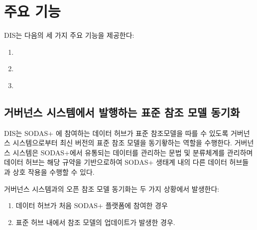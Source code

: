 \documentclass[a4paper,10pt,english]{sphinxmanual}
\begin{document}


\section{주요 기능}
\label{\detokenize{intro:id1}}
\sphinxAtStartPar
DIS는 다음의 세 가지 주요 기능을 제공한다:
\begin{enumerate}
%
\item {} 
\sphinxAtStartPar
{\hyperref[\detokenize{intro:id2}]{}}

\item {} 
\sphinxAtStartPar
{\hyperref[\detokenize{intro:sodas}]{}}

\item {} 
\sphinxAtStartPar
{\hyperref[\detokenize{intro:id3}]{}}

\end{enumerate}


\subsection{거버넌스 시스템에서 발행하는 표준 참조 모델 동기화}
\label{\detokenize{intro:id2}}
\sphinxAtStartPar
DIS는 SODAS+ 에 참여하는 데이터 허브가 표준 참조모델을 따를 수 있도록 거버넌스 시스템으로부터 최신 버전의 표준 참조 모델을 동기홯하는 역할을 수행한다.
거버넌스 시스템은 SODAS+에서 유통되는 데이터를 관리하는 문법 및 분류체계를 관리하며 데이터 허브는 해당 규약을 기반으로하여 SODAS+ 생태계 내의
다른 데이터 허브들과 상호 작용을 수행할 수 있다.


\begin{DUlineblock}{0em}
\item[] 
\end{DUlineblock}

\sphinxAtStartPar
거버넌스 시스템과의 오픈 참조 모델 동기화는 두 가지 상황에서 발생한다:
\begin{enumerate}
%
\item {} 
\sphinxAtStartPar
데이터 허브가 처음 SODAS+ 플랫폼에 참여한 경우

\item {} 
\sphinxAtStartPar
표준 허브 내에서 참조 모델의 업데이트가 발생한 경우.

\end{enumerate}
\end{document}
